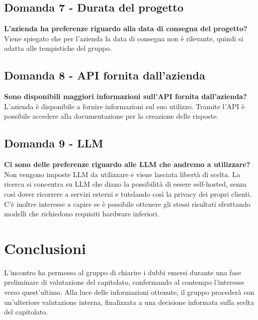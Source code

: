 \documentclass[10pt]{article}
\begin{document}
    \subsection{Domanda 7 - Durata del progetto}
    \textbf{L'azienda ha preferenze riguardo alla data di consegna del progetto?} 
    \\
    \textnormal{Viene spiegato che per l'azienda la data di consegna non è rilevante, quindi si adatta alle tempistiche del gruppo.} 

    \subsection{Domanda 8 - API fornita dall'azienda}
    \textbf{Sono disponibili maggiori informazioni sull'API fornita dall'azienda?} 
    \\
    \textnormal{L’azienda è disponibile a fornire informazioni sul suo utilizzo. Tramite l’API è possibile accedere alla documentazione per la creazione delle risposte.} 
    
    \subsection{Domanda 9 - LLM}
    \textbf{Ci sono delle preferenze riguardo alle LLM che andremo a utilizzare?} 
    \\
    \textnormal{Non vengono imposte LLM da utilizzare e viene lasciata libertà di scelta. La ricerca si concentra su LLM che diano la possibilità di essere self-hosted, senza così dover ricorrere a servizi esterni e tutelando così la privacy dei propri clienti. C'è inoltre interesse a capire se è possibile ottenere gli stessi risultati sfruttando modelli che richiedono requisiti hardware inferiori.} 
    
    
    \section{Conclusioni}
    L'incontro ha permesso al gruppo di chiarire i dubbi emersi durante una fase preliminare di valutazione del capitolato, confermando al contempo l'interesse verso quest'ultimo. Alla luce delle informazioni ottenute, il gruppo procederà con un'ulteriore valutazione interna, finalizzata a una decisione informata sulla scelta del capitolato.
    \newpage
    \newpage

     
\end{document}
